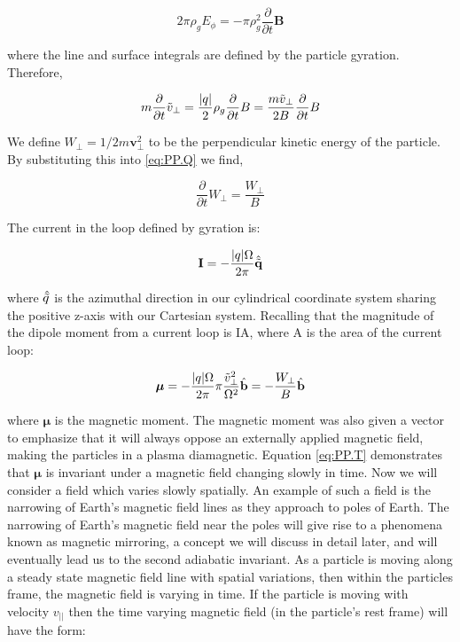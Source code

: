 \documentclass[utf8]{report}
\begin{document}
\begin{equation}
    2 \pi \rho_{g} E_{\phi} = -\pi \rho^{2}_{g} \frac{\partial }{\partial t} \textbf{B} 
    \label{eq:PP.P}
\end{equation}

where the line and surface integrals are defined by the particle gyration. Therefore, 

\begin{equation}
    m \frac{\partial }{\partial t} \Tilde{v}_{\perp} = \frac{|q|}{2} \rho_{g} \frac{\partial }{\partial t} B = \frac{m\Tilde{v}_{\perp}}{2B} \frac{\partial }{\partial t} B
    \label{eq:PP.Q}
\end{equation}

We define $W_{\perp} = 1/2 m \textbf{v}^{2}_{\perp}$ to be the perpendicular kinetic energy of the particle. By substituting this into \ref{eq:PP.Q} we find, 

\begin{equation}
    \frac{\partial }{\partial t} W_{\perp} = \frac{W_{\perp}}{B} 
    \label{eq:PP.R}
\end{equation}

The current in the loop defined by gyration is: 

\begin{equation}
    \textbf{I} = -\frac{|q|\Omega}{2\pi} \hat{\Tilde{\textbf{q}}}
    \label{eq:PP.S}
\end{equation}

where $\hat{\Tilde{q}}$ is the azimuthal direction in our cylindrical coordinate system sharing the positive z-axis with our Cartesian system. Recalling that the magnitude of the dipole moment from a  current loop is IA, where A is the area of the current loop: 

\begin{equation}
    \boldsymbol\mu = -\frac{|q|\Omega}{2\pi} \pi \frac{\Tilde{v}^{2}_{\perp}}{\Omega^{2}} \hat{\textbf{b}} = - \frac{W_{\perp}}{B} \hat{\textbf{b}}
    \label{eq:PP.T}
\end{equation}

where $\boldsymbol\mu$ is the magnetic moment. The magnetic moment was also given a vector to emphasize that it will always oppose an externally applied magnetic field, making the particles in a plasma diamagnetic. Equation \ref{eq:PP.T} demonstrates that $\boldsymbol\mu$ is invariant under a magnetic field changing slowly in time. Now we will consider a field which varies slowly spatially. An example of such a field is the narrowing of Earth's magnetic field lines as they approach to poles of Earth. The narrowing of Earth's magnetic field near the poles will give rise to a phenomena known as magnetic mirroring, a concept we will discuss in detail later, and will eventually lead us to the second adiabatic invariant. As a particle is moving along a steady state magnetic field line with spatial variations, then within the particles frame, the magnetic field is varying in time. If the particle is moving with velocity $v_{||}$ then the time varying magnetic field (in the particle's rest frame) will have the form: 
\end{document}
